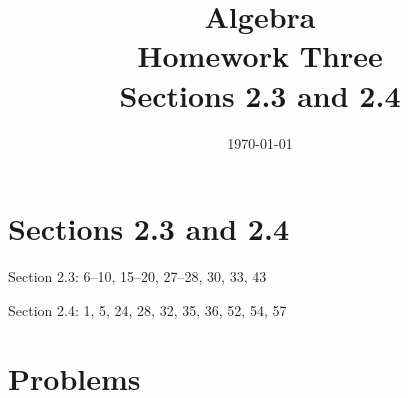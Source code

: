 \documentclass[letterpaper, landscape]{exam}
\title{Algebra \\ Homework Three \\ Sections 2.3 and 2.4}
\author{}
\date{\today}
\begin{document}
  \maketitle

  \section{Sections 2.3 and 2.4}
  \begin{itemize*}
    \item Section 2.3: 6--10, 15--20, 27--28, 30, 33, 43
    \item Section 2.4: 1, 5, 24, 28, 32, 35, 36, 52, 54, 57
  \end{itemize*}

  \section{Problems}
\end{document}
